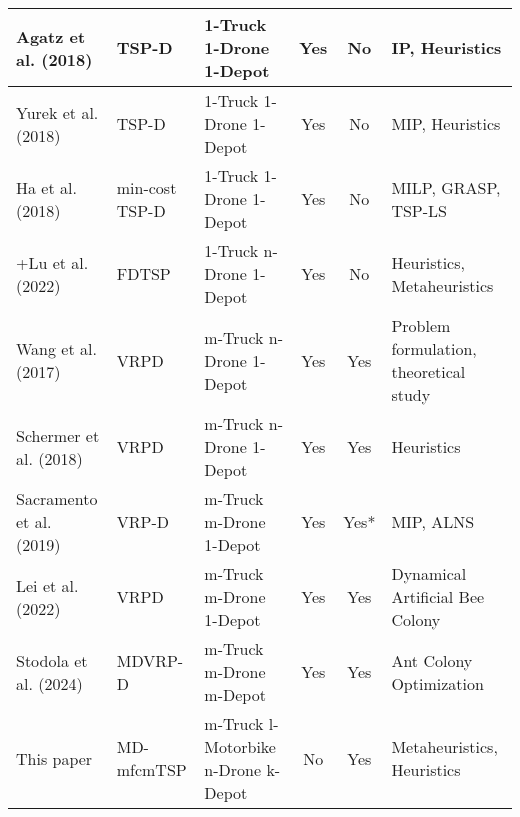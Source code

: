 \begin{table*}[]
{\begin{tabular}{@{}lllccl@{}}
			Agatz et al. (2018) & TSP-D & 1-Truck 1-Drone 1-Depot & Yes & No & IP, Heuristics \\
			\midrule
			Yurek et al. (2018) & TSP-D & 1-Truck 1-Drone 1-Depot & Yes & No & MIP, Heuristics \\
			\midrule
			Ha et al. (2018) & min-cost TSP-D & 1-Truck 1-Drone 1-Depot & Yes & No & MILP, GRASP, TSP-LS \\
			\midrule
			+Lu et al. (2022) & FDTSP & 1-Truck n-Drone 1-Depot & Yes & No & Heuristics, Metaheuristics \\
			\midrule
			Wang et al. (2017) & VRPD & m-Truck n-Drone 1-Depot & Yes & Yes & Problem formulation, theoretical study \\
			\midrule
			Schermer et al. (2018) & VRPD & m-Truck n-Drone 1-Depot & Yes & Yes & Heuristics \\
			\midrule
			Sacramento et al. (2019) & VRP-D & m-Truck m-Drone 1-Depot & Yes & Yes* & MIP, ALNS \\
			\midrule
			Lei et al. (2022) & VRPD & m-Truck m-Drone 1-Depot & Yes & Yes & Dynamical Artificial Bee Colony \\
			\midrule
			Stodola et al. (2024) & MDVRP-D & m-Truck m-Drone m-Depot & Yes & Yes & Ant Colony Optimization \\
			\midrule
			This paper & MD-mfcmTSP & m-Truck l-Motorbike n-Drone k-Depot & No & Yes & Metaheuristics, Heuristics \\
			\bottomrule
		\end{tabular}%
	}
\end{table*}
